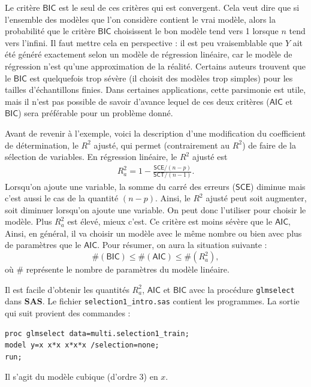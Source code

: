 \documentclass[
  11pt,
  letterpaper,
]{book}
\theoremstyle{definition}
\theoremstyle{definition}
\theoremstyle{definition}
\theoremstyle{remark}
\begin{document}
Le critère \(\mathsf{BIC}\) est le seul de ces critères qui est convergent. Cela veut dire que si l'ensemble des modèles que l'on considère contient le vrai modèle, alors la probabilité que le critère \(\mathsf{BIC}\) choisissent le bon modèle tend vers 1 lorsque \(n\) tend vers l'infini. Il faut mettre cela en perspective : il est peu vraisemblable que \(Y\) ait été généré exactement selon un modèle de régression linéaire, car le modèle de régression n'est qu'une approximation de la réalité. Certains auteurs trouvent que le \(\mathsf{BIC}\) est quelquefois trop sévère (il choisit des modèles trop simples) pour les tailles d'échantillons finies. Dans certaines applications, cette parsimonie est utile, mais il n'est pas possible de savoir d'avance lequel de ces deux critères (\(\mathsf{AIC}\) et \(\mathsf{BIC}\)) sera préférable pour un problème donné.

Avant de revenir à l'exemple, voici la description d'une modification du coefficient de détermination, le \(R^2\) ajusté, qui permet (contrairement au \(R^2\)) de faire de la sélection de variables. En régression linéaire, le \(R^2\) ajusté est
\begin{align*}
R^2_a=1-\frac{\mathsf{SCE}/(n-p)}{\mathsf{SCT}/(n-1)}.
\end{align*}
Lorsqu'on ajoute une variable, la somme du carré des erreurs (\(\mathsf{SCE}\)) diminue mais c'est aussi le cas de la quantité \((n-p)\). Ainsi, le \(R^2\) ajusté peut soit augmenter, soit diminuer lorsqu'on ajoute une variable. On peut donc l'utiliser pour choisir le modèle. Plus \(R^2_a\) est élevé, mieux c'est. Ce critère est moins sévère que le \(\mathsf{AIC}\), Ainsi, en général, il va choisir un modèle avec le même nombre ou bien avec plus de paramètres que le \(\mathsf{AIC}\). Pour résumer, on aura la situation suivante :
\[ \#(\mathsf{BIC}) \leq \#(\mathsf{AIC}) \leq \#(R^2_a),\]
où \(\#\) représente le nombre de paramètres du modèle linéaire.

Il est facile d'obtenir les quantités \(R^2_a\), \(\mathsf{AIC}\) et \(\mathsf{BIC}\) avec la procédure \texttt{glmselect} dans \textbf{SAS}. Le fichier \texttt{selection1\_intro.sas} contient les programmes. La sortie qui suit provient des commandes :

\begin{verbatim}
proc glmselect data=multi.selection1_train;
model y=x x*x x*x*x /selection=none;
run;
\end{verbatim}

Il s'agit du modèle cubique (d'ordre 3) en \(x\).
\end{document}
